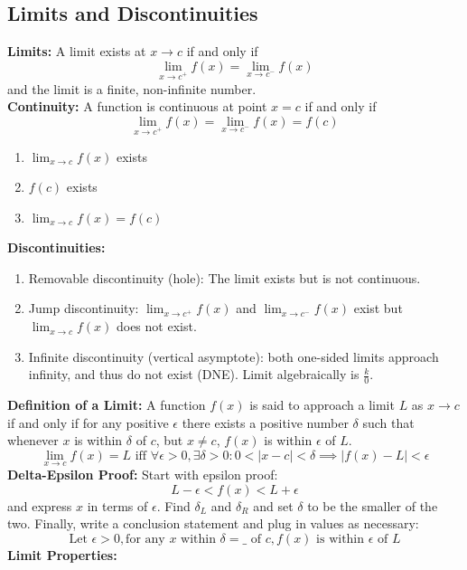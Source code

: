 \documentclass[12pt, letterpaper]{article}
\begin{document}
\subsection{Limits and Discontinuities}
\textbf{Limits:} A limit exists at $x\rightarrow c$ if and only if \[\lim_{x\rightarrow c^+}f(x)=\lim_{x\rightarrow c^-}f(x)\] and the limit is a finite, non-infinite number. \vspace{1em}\\
\textbf{Continuity:} A function is continuous at point $x=c$ if and only if \[\lim_{x\rightarrow c^+}f(x)=\lim_{x\rightarrow c^-}f(x)=f(c)\]
\begin{enumerate}
    \item $\lim_{x\rightarrow c}f(x)$ exists
    \item $f(c)$ exists
    \item $\lim_{x\rightarrow c}f(x)=f(c)$
\end{enumerate}
\textbf{Discontinuities:}
\begin{enumerate}
    \item Removable discontinuity (hole): The limit exists but is not continuous.
    \item Jump discontinuity: $\lim_{x\rightarrow c^+}f(x)$ and $\lim_{x\rightarrow c^-}f(x)$ exist but $\lim_{x\rightarrow c}f(x)$ does not exist.
    \item Infinite discontinuity (vertical asymptote): both one-sided limits approach infinity, and thus do not exist (DNE). Limit algebraically is $\frac{k}{0}$.
\end{enumerate}
\textbf{Definition of a Limit:} A function $f(x)$ is said to approach a limit $L$ as $x\rightarrow c$ if and only if for any positive $\epsilon$ there exists a positive number $\delta$ such that whenever $x$ is within $\delta$ of $c$, but $x\neq c$, $f(x)$ is within $\epsilon$ of $L$. \[\lim_{x\rightarrow c}f(x)=L \text{ iff } \forall\epsilon>0, \exists\delta>0: 0<|x-c|<\delta\implies|f(x)-L|<\epsilon\]
\textbf{Delta-Epsilon Proof:} Start with epsilon proof: \[L-\epsilon<f(x)<L+\epsilon\] and express $x$ in terms of $\epsilon$. Find $\delta_L$ and $\delta_R$ and set $\delta$ to be the smaller of the two. Finally, write a conclusion statement and plug in values as necessary: \[\text{Let } \epsilon>0, \text{for any }x\text{ within }\delta=\_ \text{ of } c, f(x)\text{ is within } \epsilon \text{ of }L\]
\textbf{Limit Properties:} 
\end{document}
